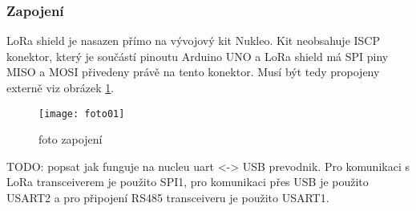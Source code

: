 


\subsubsection{Zapojení}
LoRa shield \cite{draginoWiki} je nasazen přímo na vývojový kit Nukleo. Kit neobsahuje ISCP konektor, který je součástí pinoutu Arduino UNO a LoRa shield má SPI piny MISO a MOSI přivedeny právě na tento konektor. Musí být tedy propojeny externě viz obrázek \ref{fig:03}. 

\begin{figure}[!h]
    \centering
    \texttt{[image: foto01]}
    \caption{foto zapojení}
    \label{fig:03}
\end{figure}

TODO: popsat jak funguje na nucleu uart <-> USB prevodnik.
Pro komunikaci s LoRa transceiverem je použito SPI1, pro komunikaci přes USB je použito USART2 a pro připojení RS485 transceiveru je použito USART1.

